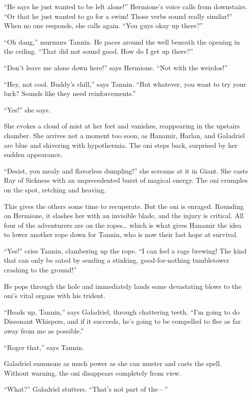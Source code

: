 \documentclass[smalldemyvopaper,11pt,twoside,onecolumn,openright,extrafontsizes]{memoir}
\begin{document}
``He says he just wanted to be left alone!'' Hermione's voice calls from
downstairs. ``Or that he just wanted to go for a swim! Those verbs sound
really similar!'' When no one responds, she calls again. ``You guys okay
up there?''

``Oh dang,'' murmurs Tannin. He paces around the well beneath the
opening in the ceiling. ``That did not sound good. How do I get up
there?''

``Don't leave me alone down here!'' says Hermione. ``Not with the
weirdos!''

``Hey, not cool. Buddy's chill,'' says Tannin. ``But whatever, you want
to try your luck? Sounds like they need reinforcements.''

``Yes!'' she says.

She evokes a cloud of mist at her feet and vanishes, reappearing in the
upstairs chamber. She arrives not a moment too soon, as Hanamir, Harlan,
and Galadriel are blue and shivering with hypothermia. The oni steps
back, surprised by her sudden appearance.

``Desist, you mealy and flavorless dumpling!'' she screams at it in
Giant. She casts Ray of Sickness with an unprecedented burst of magical
energy. The oni crumples on the spot, retching and heaving.

This gives the others some time to recuperate. But the oni is enraged.
Rounding on Hermione, it slashes her with an invisible blade, and the
injury is critical. All four of the adventurers are on the ropes\ldots{}
which is what gives Hanamir the idea to lower another rope down for
Tannin, who is now their last hope at survival.

``Yes!'' cries Tannin, clambering up the rope. ``I can feel a rage
brewing! The kind that can only be sated by sending a stinking,
good-for-nothing tumbletower crashing to the ground!''

He pops through the hole and immediately lands some devastating blows to
the oni's vital organs with his trident.

``Heads up, Tannin,'' says Galadriel, through chattering teeth. ``I'm
going to do Dissonant Whispers, and if it succeeds, he's going to be
compelled to flee as far away from me as possible.''

``Roger that,'' says Tannin.

Galadriel summons as much power as she can muster and casts the spell.
Without warning, the oni disappears completely from view.

``What?'' Galadriel stutters. ``That's not part of the---''
\end{document}
